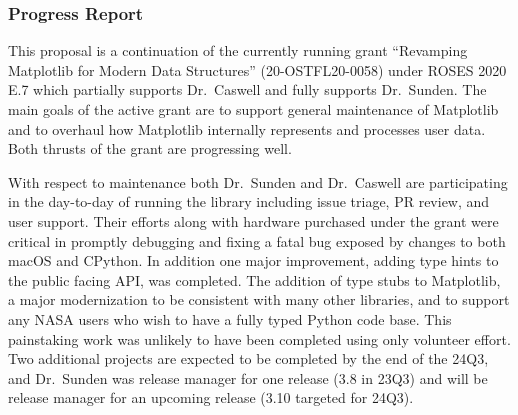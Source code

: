 \documentclass[12pt]{article}
\numberwithin{page}{section}
\begin{document}


\subsubsection{Progress Report}


This proposal is a continuation of the currently running grant ``Revamping
Matplotlib for Modern Data Structures'' (20-OSTFL20-0058) under ROSES 2020 E.7
which partially supports Dr.\ Caswell and fully supports Dr.\ Sunden.  The main
goals of the active grant are to support general maintenance of Matplotlib and to
overhaul how Matplotlib internally represents and processes user data.  Both
thrusts of the grant are progressing well.

With respect to maintenance both Dr.\ Sunden and Dr.\ Caswell are participating
in the day-to-day of running the library including issue triage, PR review, and
user support.  Their efforts along with hardware purchased under the grant were
critical in promptly debugging and fixing a fatal bug exposed by changes to
both macOS and CPython.  In addition one major improvement, adding type hints
to the public facing API, was completed.  The addition of type stubs to
Matplotlib, a major modernization to be consistent with many other libraries,
and to support any NASA users who wish to have a fully typed Python code base.
This painstaking work was unlikely to have been completed using only volunteer
effort.  Two additional projects are expected to be completed by the end of the
24Q3, and Dr.\ Sunden was release manager for one release (3.8 in 23Q3) and
will be release manager for an upcoming release (3.10 targeted for 24Q3).
\end{document}

